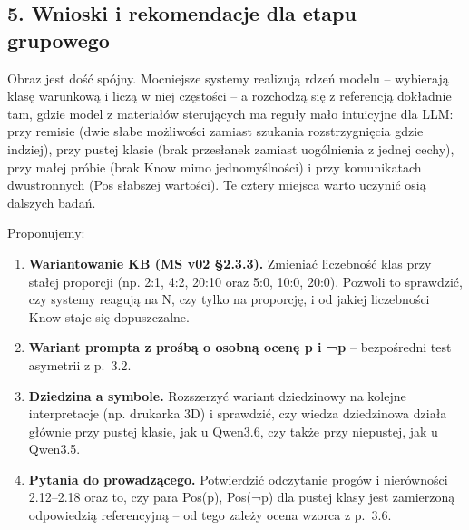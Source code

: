 \documentclass[
  polish,
]{article}
\providecommand{\tightlist}{%
  \setlength{\itemsep}{0pt}\setlength{\parskip}{0pt}}
\begin{document}
\subsection{5. Wnioski i rekomendacje dla etapu grupowego}

Obraz jest dość spójny. Mocniejsze systemy realizują rdzeń modelu --
wybierają klasę warunkową i liczą w niej częstości -- a rozchodzą się z
referencją dokładnie tam, gdzie model z materiałów sterujących ma reguły
mało intuicyjne dla LLM: przy remisie (dwie słabe możliwości zamiast
szukania rozstrzygnięcia gdzie indziej), przy pustej klasie (brak
przesłanek zamiast uogólnienia z jednej cechy), przy małej próbie (brak
Know mimo jednomyślności) i przy komunikatach dwustronnych (Pos słabszej
wartości). Te cztery miejsca warto uczynić osią dalszych badań.

Proponujemy:

\begin{enumerate}
\def\labelenumi{\arabic{enumi}.}
\tightlist
\item
  \textbf{Wariantowanie KB (MS v02 §2.3.3).} Zmieniać liczebność klas
  przy stałej proporcji (np. 2:1, 4:2, 20:10 oraz 5:0, 10:0, 20:0).
  Pozwoli to sprawdzić, czy systemy reagują na N, czy tylko na
  proporcję, i od jakiej liczebności Know staje się dopuszczalne.
\item
  \textbf{Wariant prompta z prośbą o osobną ocenę p i ¬p} -- bezpośredni
  test asymetrii z p.~3.2.
\item
  \textbf{Dziedzina a symbole.} Rozszerzyć wariant dziedzinowy na
  kolejne interpretacje (np. drukarka 3D) i sprawdzić, czy wiedza
  dziedzinowa działa głównie przy pustej klasie, jak u Qwen3.6, czy
  także przy niepustej, jak u Qwen3.5.
\item
  \textbf{Pytania do prowadzącego.} Potwierdzić odczytanie progów i
  nierówności 2.12--2.18 oraz to, czy para Pos(p), Pos(¬p) dla pustej
  klasy jest zamierzoną odpowiedzią referencyjną -- od tego zależy ocena
  wzorca z p.~3.6.
\end{enumerate}
\end{document}
